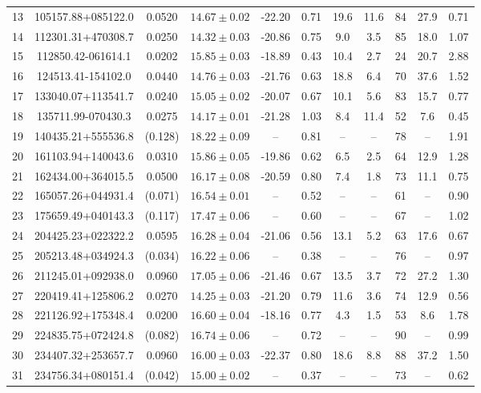 \documentclass[a4paper,fleqn,usenatbib]{mnras}
\begin{document}
\begin{table}
\begin{minipage}{180mm}
\begin{tabular}{ccccccccccc}
13 & 105157.88+085122.0 & 0.0520 & $14.67\pm0.02$ & -22.20 & 0.71 & 19.6 & 11.6 & 84 & 27.9 & 0.71\\
14 & 112301.31+470308.7 & 0.0250 & $14.32\pm0.03$ & -20.86 & 0.75 & 9.0 & 3.5 & 85 & 18.0 & 1.07\\
15 & 112850.42-061614.1 & 0.0202 & $15.85\pm0.03$ & -18.89 & 0.43 & 10.4 & 2.7 & 24 & 20.7 & 2.88\\
16 & 124513.41-154102.0 & 0.0440 & $14.76\pm0.03$ & -21.76 & 0.63 & 18.8 & 6.4 & 70 & 37.6 & 1.52\\
17 & 133040.07+113541.7 & 0.0240 & $15.05\pm0.02$ & -20.07 & 0.67 & 10.1 & 5.6 & 83 & 15.7 & 0.77\\
18 & 135711.99-070430.3 & 0.0275 & $14.17\pm0.01$ & -21.28 & 1.03 & 8.4 & 11.4 & 52 & 7.6 & 0.45\\
19 & 140435.21+555536.8 & (0.128) &$18.22\pm0.09$ & -- & 0.81 & -- & -- & 78 & -- & 1.91\\
20 & 161103.94+140043.6 & 0.0310 & $15.86\pm0.05$ & -19.86 & 0.62 & 6.5 & 2.5 & 64 & 12.9 & 1.28\\
21 & 162434.00+364015.5 & 0.0500 & $16.17\pm0.08$ & -20.59 & 0.80 & 7.4 & 1.8 & 73 & 11.1 & 0.75\\
22 & 165057.26+044931.4 & (0.071) &$16.54\pm0.01$ & -- & 0.52 & -- & -- & 61 & -- & 0.90\\
23 & 175659.49+040143.3 & (0.117) &$17.47\pm0.06$ & -- & 0.60 & -- & -- & 67 & -- & 1.02\\
24 & 204425.23+022322.2 & 0.0595 & $16.28\pm0.04$ & -21.06 & 0.56 & 13.1 & 5.2 & 63 & 17.6 & 0.67\\
25 & 205213.48+034924.3 & (0.034) &$16.22\pm0.06$ & -- & 0.38 & -- & -- & 76 & -- & 0.97\\
26 & 211245.01+092938.0 & 0.0960 & $17.05\pm0.06$ & -21.46 & 0.67 & 13.5 & 3.7 & 72 & 27.2 & 1.30\\
27 & 220419.41+125806.2 & 0.0270 & $14.25\pm0.03$ & -21.20 & 0.79 & 11.6 & 3.6 & 74 & 12.9 & 0.56\\
28 & 221126.92+175348.4 & 0.0200 & $16.60\pm0.04$ & -18.16 & 0.77 & 4.3 & 1.5 & 53 & 8.6 & 1.78\\
29 & 224835.75+072424.8 & (0.082) &$16.74\pm0.06$ & -- & 0.72 & -- & -- & 90 & -- & 0.99\\
30 & 234407.32+253657.7 & 0.0960 & $16.00\pm0.03$ & -22.37 & 0.80 & 18.6 & 8.8 & 88 & 37.2 & 1.50\\
31 & 234756.34+080151.4 & (0.042) &$15.00\pm0.02$ & -- & 0.37 & -- & -- & 73 & -- & 0.62\\


\end{tabular}
\end{minipage}
\end{table}
\end{document}
